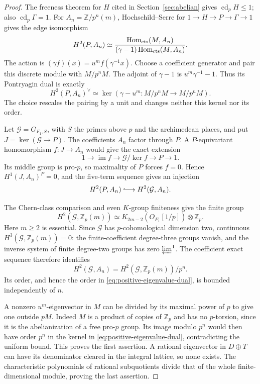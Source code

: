 \begin{proof}
The freeness theorem for $H$ cited in Section~\ref{sec:abelian}
gives $\operatorname{cd}_pH\leq1$; also
$\operatorname{cd}_p\Gamma=1$.
For $A_n=\mathbb Z/p^n(m)$, Hochschild--Serre for
$1\to H\to P\to\Gamma\to1$ gives the edge isomorphism
\[
 H^2(P,A_n)\simeq
 \frac{\operatorname{Hom}_{\rm cts}(M,A_n)}
      {(\gamma-1)\operatorname{Hom}_{\rm cts}(M,A_n)}.
\]
The action is $(\gamma f)(x)=u^m f(\gamma^{-1}x)$.
Choose a coefficient generator and pair this discrete
module with $M/p^nM$. The adjoint of $\gamma-1$ is
$u^m\gamma^{-1}-1$. Thus its Pontryagin dual is exactly
\begin{equation}\label{eq:positive-eigenvalue-dual}
 H^2(P,A_n)^\vee\simeq
       \ker(\gamma-u^m:M/p^nM\longrightarrow M/p^nM).
\end{equation}
The choice rescales the pairing by a unit and changes
neither this kernel nor its order.

Let $\mathcal G=G_{F_1,S}$, with $S$ the primes above $p$
and the archimedean places, and put
$J=\ker(\mathcal G\to P)$. The coefficients $A_n$ factor
through $P$. A $P$-equivariant homomorphism $f:J\to A_n$
would give the exact extension
\[
 1\longrightarrow\operatorname{im}f\longrightarrow
       \mathcal G/\ker f\longrightarrow P\longrightarrow1.
\]
Its middle group is pro-$p$, so maximality of $P$ forces
$f=0$. Hence $H^1(J,A_n)^P=0$, and the five-term sequence
gives an injection
\[
                    H^2(P,A_n)\lhook\joinrel\longrightarrow
                         H^2(\mathcal G,A_n).
\]

The Chern-class comparison and even $K$-group finiteness
\cite[VI, Theorem~8.2, chapter p.~47]{Weibel} give the
finite group
\[
 H^2(\mathcal G,\mathbb Z_p(m))
     \simeq K_{2m-2}(O_{F_1}[1/p])\otimes\mathbb Z_p.
\]
Here $m\geq2$ is essential. Since $\mathcal G$ has
$p$-cohomological dimension two, continuous
$H^3(\mathcal G,\mathbb Z_p(m))=0$: the finite-coefficient
degree-three groups vanish, and the inverse system of
finite degree-two groups has zero $\varprojlim^1$.
The coefficient exact sequence therefore identifies
\[
 H^2(\mathcal G,A_n)
      =H^2(\mathcal G,\mathbb Z_p(m))/p^n.
\]
Its order, and hence the order in
\eqref{eq:positive-eigenvalue-dual}, is bounded independently of $n$.

A nonzero $u^m$-eigenvector in $M$ can be divided by its
maximal power of $p$ to give one outside $pM$.
Indeed $M$ is a product of copies of $\mathbb Z_p$ and
has no $p$-torsion, since it is the abelianization of
a free pro-$p$ group. Its image modulo $p^n$ would then
have order $p^n$ in the kernel in
\eqref{eq:positive-eigenvalue-dual}, contradicting the
uniform bound. This proves the first assertion.
A rational eigenvector in $D\oplus T$ can have its
denominator cleared in the integral lattice, so none
exists. The characteristic polynomials of rational
subquotients divide that of the whole finite-dimensional
module, proving the last assertion.
\end{proof}

